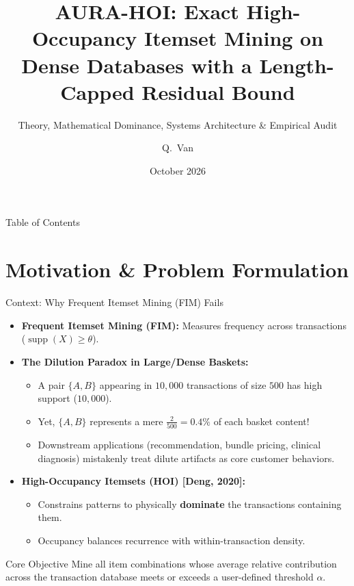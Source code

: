 \documentclass[aspectratio=169,10pt]{beamer}
\title[AURA-HOI: Exact HOI Mining on Dense Databases]{AURA-HOI: Exact High-Occupancy Itemset Mining on Dense Databases with a Length-Capped Residual Bound}
\subtitle{Theory, Mathematical Dominance, Systems Architecture \& Empirical Audit}
\author[Q.~Van]{Q.~Van}
\institute[JIIS 2026]{
  Journal of Intelligent Information Systems (JIIS)\\
  Springer Nature
}
\date{October 2026}
\newcommand{\supp}{\operatorname{supp}}
\begin{document}
\begin{frame}[plain]
  \titlepage
\end{frame}

\begin{frame}{Table of Contents}
  \tableofcontents
\end{frame}

\section{Motivation \& Problem Formulation}

\begin{frame}{Context: Why Frequent Itemset Mining (FIM) Fails}
  \begin{itemize}
    \item \textbf{Frequent Itemset Mining (FIM):} Measures frequency across transactions ($\supp(X) \ge \theta$).
    \item \textbf{The Dilution Paradox in Large/Dense Baskets:}
      \begin{itemize}
        \item A pair $\{A, B\}$ appearing in $10,000$ transactions of size $500$ has high support ($10,000$).
        \item Yet, $\{A, B\}$ represents a mere $\frac{2}{500} = 0.4\%$ of each basket content!
        \item Downstream applications (recommendation, bundle pricing, clinical diagnosis) mistakenly treat dilute artifacts as core customer behaviors.
      \end{itemize}
    \item \textbf{High-Occupancy Itemsets (HOI) [Deng, 2020]:}
      \begin{itemize}
        \item Constrains patterns to physically \textbf{dominate} the transactions containing them.
        \item Occupancy balances recurrence with within-transaction density.
      \end{itemize}
  \end{itemize}

  \begin{block}{Core Objective}
    Mine all item combinations whose average relative contribution across the transaction database meets or exceeds a user-defined threshold $\alpha$.
  \end{block}
\end{frame}
\end{document}
